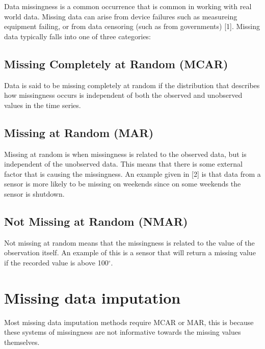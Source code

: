 \documentclass[
]{report}
\begin{document}
Data missingness is a common occurrence that is common in working with
real world data. Missing data can arise from device failures such as
measureing equipment failing, or from data censoring (such as from
governments) {[}1{]}. Missing data typically falls into one of three
categories:

\subsection{Missing Completely at Random
(MCAR)}\label{missing-completely-at-random-mcar}

Data is said to be missing completely at random if the distribution that
describes how missingness occurs is independent of both the observed and
unobserved values in the time series.

\subsection{Missing at Random (MAR)}\label{missing-at-random-mar}

Missing at random is when missingness is related to the observed data,
but is independent of the unobserved data. This means that there is some
external factor that is causing the missingness. An example given in
{[}2{]} is that data from a sensor is more likely to be missing on
weekends since on some weekends the sensor is shutdown.

\subsection{Not Missing at Random
(NMAR)}\label{not-missing-at-random-nmar}

Not missing at random means that the missingness is related to the value
of the observation itself. An example of this is a sensor that will
return a missing value if the recorded value is above 100\(^\circ\).


\section{Missing data imputation}\label{missing-data-imputation}

Most missing data imputation methods require MCAR or MAR, this is
because these systems of missingness are not informative towards the
missing values themselves. 
\end{document}
